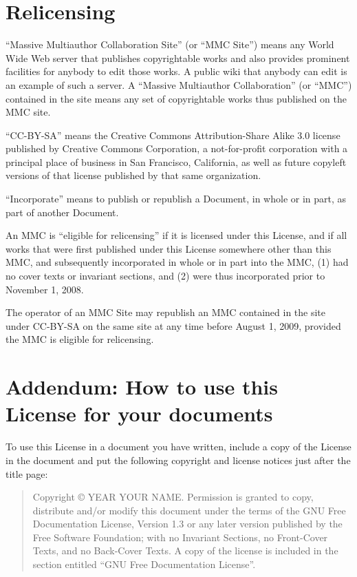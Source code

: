 \section{Relicensing}

``Massive Multiauthor Collaboration Site'' (or ``MMC Site'') means any
World Wide Web server that publishes copyrightable works and also
provides prominent facilities for anybody to edit those works.  A
public wiki that anybody can edit is an example of such a server.  A
``Massive Multiauthor Collaboration'' (or ``MMC'') contained in the
site means any set of copyrightable works thus published on the MMC
site.

``CC-BY-SA'' means the Creative Commons Attribution-Share Alike 3.0
license published by Creative Commons Corporation, a not-for-profit
corporation with a principal place of business in San Francisco,
California, as well as future copyleft versions of that license
published by that same organization.

``Incorporate'' means to publish or republish a Document, in whole or
in part, as part of another Document.

An MMC is ``eligible for relicensing'' if it is licensed under this
License, and if all works that were first published under this License
somewhere other than this MMC, and subsequently incorporated in whole
or in part into the MMC, (1) had no cover texts or invariant sections,
and (2) were thus incorporated prior to November 1, 2008.

The operator of an MMC Site may republish an MMC contained in the site
under CC-BY-SA on the same site at any time before August 1, 2009,
provided the MMC is eligible for relicensing.

\section{Addendum: How to use this License for your documents}

To use this License in a document you have written, include a copy of
the License in the document and put the following copyright and
license notices just after the title page:

\bigskip
\begin{quote}
    Copyright \copyright{}  YEAR  YOUR NAME.
    Permission is granted to copy, distribute and/or modify this document
    under the terms of the GNU Free Documentation License, Version 1.3
    or any later version published by the Free Software Foundation;
    with no Invariant Sections, no Front-Cover Texts, and no Back-Cover Texts.
    A copy of the license is included in the section entitled ``GNU
    Free Documentation License''.
\end{quote}
\bigskip
    
